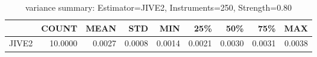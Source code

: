 \begin{table}[ht]
\centering
\caption{variance summary: Estimator=JIVE2, Instruments=250, Strength=0.80}
\begin{tabular}{lrrrrrrrr}
\toprule
 & COUNT & MEAN & STD & MIN & 25\% & 50\% & 75\% & MAX \\
\midrule
JIVE2 & 10.0000 & 0.0027 & 0.0008 & 0.0014 & 0.0021 & 0.0030 & 0.0031 & 0.0038 \\
\bottomrule
\end{tabular}
\end{table}
